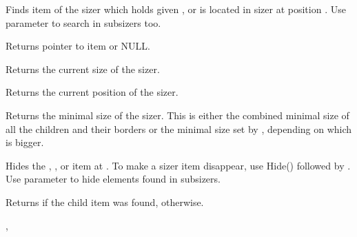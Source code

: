 
Finds item of the sizer which holds given ,  or is located
in sizer at position .
Use parameter  to search in subsizers too.

Returns pointer to item or NULL.


\label{wxsizergetsize}


Returns the current size of the sizer.


\label{wxsizergetposition}


Returns the current position of the sizer.


\label{wxsizergetminsize}


Returns the minimal size of the sizer. This is either the combined minimal
size of all the children and their borders or the minimal size set by 
, depending on which is bigger.


\label{wxsizerhide}




Hides the , , or item at .
To make a sizer item disappear, use Hide() followed by .
Use parameter  to hide elements found in subsizers.

Returns \true if the child item was found, \false otherwise.


,\rtfsp
{}


\label{wxsizerinsert}



